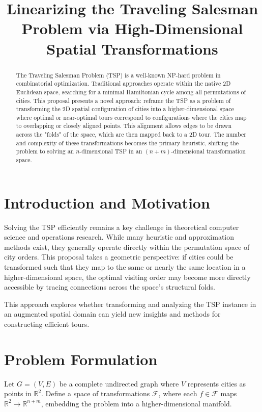 \documentclass{article}
\title{Linearizing the Traveling Salesman Problem via High-Dimensional Spatial Transformations}
\author{}
\date{}
\begin{document}
\maketitle

\begin{abstract}
The Traveling Salesman Problem (TSP) is a well-known NP-hard problem in combinatorial optimization. Traditional approaches operate within the native 2D Euclidean space, searching for a minimal Hamiltonian cycle among all permutations of cities. This proposal presents a novel approach: reframe the TSP as a problem of transforming the 2D spatial configuration of cities into a higher-dimensional space where optimal or near-optimal tours correspond to configurations where the cities map to overlapping or closely aligned points. This alignment allows edges to be drawn across the "folds" of the space, which are then mapped back to a 2D tour. The number and complexity of these transformations becomes the primary heuristic, shifting the problem to solving an $n$-dimensional TSP in an $(n+m)$-dimensional transformation space.
\end{abstract}

\section{Introduction and Motivation}
Solving the TSP efficiently remains a key challenge in theoretical computer science and operations research. While many heuristic and approximation methods exist, they generally operate directly within the permutation space of city orders. This proposal takes a geometric perspective: if cities could be transformed such that they map to the same or nearly the same location in a higher-dimensional space, the optimal visiting order may become more directly accessible by tracing connections across the space's structural folds.

This approach explores whether transforming and analyzing the TSP instance in an augmented spatial domain can yield new insights and methods for constructing efficient tours.

\section{Problem Formulation}
Let $G = (V, E)$ be a complete undirected graph where $V$ represents cities as points in $\mathbb{R}^2$. Define a space of transformations $\mathcal{F}$, where each $f \in \mathcal{F}$ maps $\mathbb{R}^2 \rightarrow \mathbb{R}^{n+m}$, embedding the problem into a higher-dimensional manifold.
\end{document}
